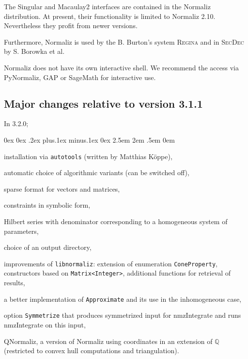 \documentclass[12pt,a4paper]{scrartcl}
\newcounter{listi}
\newcommand{\stdli}{ \topsep0ex \partopsep0ex %
\parsep.2ex plus.1ex minus.1ex \itemsep0ex%
\leftmargin2.5em \labelwidth2em \labelsep.5em \rightmargin0em}%
\newenvironment{arab}{\begin{list}{\textup{(\arabic{listi})}}%
	{\usecounter{listi}\stdli}}{\end{list}}
\theoremstyle{definition}
\def\QQ{{\mathbb Q}}
\def\ttt{\texttt}
\begin{document}
The Singular and Macaulay2 interfaces are contained in the
Normaliz distribution. At present, their functionality is limited to Normaliz 2.10. Nevertheless they profit from newer versions.

Furthermore,  Normaliz is used by the  B. Burton's system
\textsc{Regina} and in \textsc{SecDec} by S. Borowka et al.

Normaliz does not have its own interactive shell. We recommend the access via PyNormaliz, GAP or SageMath for interactive use.

\subsection{Major changes relative to version 3.1.1}

In 3.2.0;

\begin{arab}
	
	\item installation via \ttt{autotools} (written by Matthias K\"oppe),
	
	
	\item automatic choice of algorithmic variants (can be switched off),
		
	\item sparse format for vectors and matrices,
	
	\item constraints in symbolic form,
	
	\item Hilbert series with denominator corresponding to a homogeneous system of parameters,
	
	\item choice of an output directory,
	
	\item improvements of \verb|libnormaliz|: extension of enumeration \verb|ConeProperty|, constructors based on \verb|Matrix<Integer>|, additional functions for retrieval of results,
	
	\item a better implementation of \verb|Approximate| and its use in the inhomogeneous case,
	
	\item option \verb|Symmetrize| that produces symmetrized input for nmzIntegrate and runs nmzIntegrate on this input,
	
	\item QNormaliz, a version of Normaliz using coordinates in an extension of $\QQ$ (restricted to convex hull computations and triangulation).
	
\end{arab}
\end{document}
